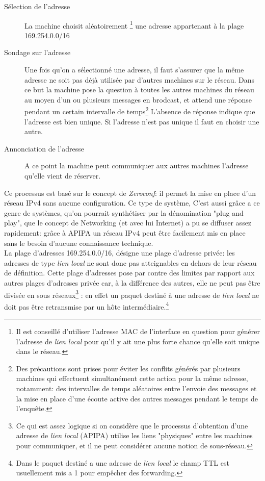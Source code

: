 \begin{description}
\begin{description}
\item[Sélection de l'adresse]
La machine choisit aléatoirement
    \footnote{Il est conseillé d'utiliser l'adresse MAC de l'interface en question
    pour générer l'adresse de {\it lien local} pour qu'il y ait une plus forte chance
    qu'elle soit unique dans le réseau.} 
une adresse appartenant à la plage 169.254.0.0/16

\item[Sondage sur l'adresse]
Une fois qu'on a sélectionné une adresse, il faut s'assurer que la même adresse ne soit
pas déjà utilisée par d'autres machines sur le réseau. Dans ce but la machine
pose la question à toutes les autres machines du réseau au moyen d'un ou plusieurs messages
en brodcast, et attend une réponse pendant un certain intervalle de temps\footnote{
Des précautions sont prises pour éviter les conflits générés par plusieurs
machines qui effectuent simultanément cette action pour la même adresse,
notamment: des intervalles de temps aléatoires entre l'envoie des messages et la mise
en place d'une écoute active des autres messages pendant le temps de l'enquête.}
L'absence de réponse indique que l'adresse est bien unique. Si l'adresse n'est
pas unique il faut en choisir une autre.

\item[Annonciation de l'adresse]
A ce point la machine peut communiquer aux autres machines l'adresse qu'elle
vient de réserver.

\end{description}



Ce processus est basé sur le concept de {\it Zeroconf}: il permet la mise en
place d'un réseau IPv4 sans aucune configuration. Ce type de système, C'est
aussi grâce a ce genre de systèmes, qu'on pourrait synthétiser par la
dénomination "plug and play", que le concept de Networking (et avec lui
Internet) a pu se diffuser assez rapidement: grâce à APIPA un réseau IPv4 peut
être facilement mis en place sans le besoin d'aucune connaissance technique.\\

La plage d'adresses 169.254.0.0/16, désigne une plage d'adresse privée: les
adresses de type {\it lien local} ne sont donc pas atteignables en dehors de
leur réseau de définition. 
Cette plage d'adresses pose par contre des limites par rapport aux autres
plages d'adresses privée car, à la différence des autres, elle ne peut pas être
divisée en sous réseaux\footnote{Ce qui est assez logique si on considère que
le processus d'obtention d'une adresse de {\it lien local} (APIPA) utilise
les liens "physiques" entre les machines pour communiquer, et il ne peut
 considérer aucune notion de sous-réseau.}
: en effet un paquet destiné à une adresse de {\it lien local} ne doit pas être
retransmise par un hôte intermédiaire.\footnote{Dans le paquet destiné
a une adresse de {\it lien local} le champ TTL est usuellement mis a 1
pour empêcher des forwarding.}


\end{description}

